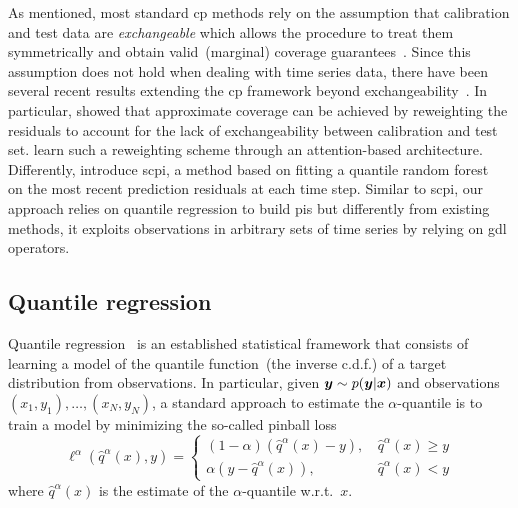 As mentioned, most standard \gls{cp} methods rely on the assumption that calibration and test data are \textit{exchangeable} which allows the procedure to treat them symmetrically and obtain valid~(marginal) coverage guarantees~\cite{angelopoulos2024theoretical}. Since this assumption does not hold when dealing with time series data, there have been several recent results extending the \gls{cp} framework beyond exchangeability~\cite{tibshirani2019conformal,stankeviciute2021conformal, gibbs2021adaptive, xu2023conformal}. In particular, \citet{barber2023conformal} showed that approximate coverage can be achieved by reweighting the residuals to account for the lack of exchangeability between calibration and test set. \citet{auer2023conformal} learn such a reweighting scheme through an attention-based architecture. Differently, \citet{xu2023sequential} introduce \gls{scpi}, a method based on fitting a quantile random forest~\cite{meinshausen2006quantile} on the most recent prediction residuals at each time step. Similar to \gls{scpi}, our approach relies on quantile regression to build \glspl{pi} but differently from existing methods, it exploits observations in arbitrary sets of time series by relying on \gls{gdl} operators. 

\subsection{Quantile regression}\label{sec:quantile-reg}

Quantile regression~\cite{koenker2001quantile} is an established statistical framework that consists of learning a model of the quantile function~(the inverse c.d.f.) of a target distribution from observations. In particular, given ${\bm{y}} \sim p({\bm{y}} | {\bm{x}})$ and observations $(x_1, y_1), \dots, (x_N, y_N)$, a standard approach to estimate the $\alpha$-quantile is to train a model by minimizing the so-called pinball loss
\begin{equation}\label{eq:pinball}
    \ell^\alpha(\hat q^\alpha(x), y) = 
    \begin{cases}
        (1-\alpha)(\hat q^\alpha(x) - y), \, &\hat q^\alpha(x) \geq y\\
        \alpha(y - \hat q^\alpha(x)), \, &\hat q^\alpha(x) < y
    \end{cases}
\end{equation}
where $\hat q^\alpha(x)$ is the estimate of the $\alpha$-quantile w.r.t.\ $x$. 

